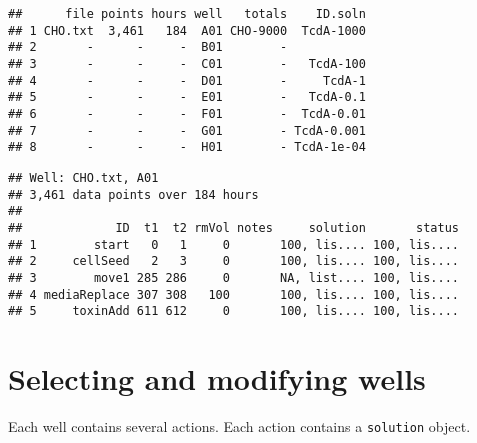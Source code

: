 \singlespacing
\begin{knitrout}
\color{fgcolor}\begin{kframe}
\begin{alltt}
 \hlkwb{=} \hlstd{(} \hlstd{=} \hlstd{,}  \hlstd{=} \hlstd{)}
\end{alltt}
\begin{alltt}
\hlstd{(wells[}\hlopt{:}\hlstd{])}
\end{alltt}
\begin{verbatim}
##      file points hours well   totals    ID.soln
## 1 CHO.txt  3,461   184  A01 CHO-9000  TcdA-1000
## 2       -      -     -  B01        -           
## 3       -      -     -  C01        -   TcdA-100
## 4       -      -     -  D01        -     TcdA-1
## 5       -      -     -  E01        -   TcdA-0.1
## 6       -      -     -  F01        -  TcdA-0.01
## 7       -      -     -  G01        - TcdA-0.001
## 8       -      -     -  H01        - TcdA-1e-04
\end{verbatim}
\begin{alltt}
\hlstd{(wells[[}\hlstd{]])}
\end{alltt}
\begin{verbatim}
## Well: CHO.txt, A01
## 3,461 data points over 184 hours
## 
##             ID  t1  t2 rmVol notes     solution       status
## 1        start   0   1     0       100, lis.... 100, lis....
## 2     cellSeed   2   3     0       100, lis.... 100, lis....
## 3        move1 285 286     0       NA, list.... 100, lis....
## 4 mediaReplace 307 308   100       100, lis.... 100, lis....
## 5     toxinAdd 611 612     0       100, lis.... 100, lis....
\end{verbatim}
\end{kframe}
\end{knitrout}
\doublespacing

\section{Selecting and modifying wells}
Each well contains several actions. Each action contains
a \texttt{solution} object.

